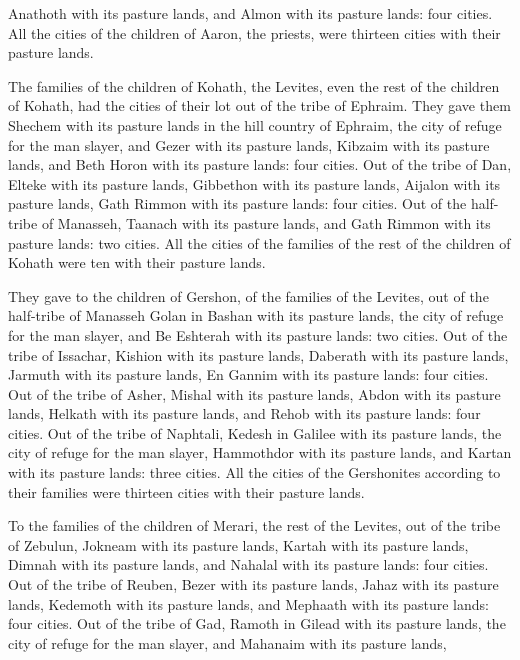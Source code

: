 {Anathoth with its pasture lands, and Almon with its pasture lands: four cities.
All the cities of the children of Aaron, the priests, were thirteen cities with their pasture lands.
\par }{\PP {}The families of the children of Kohath, the Levites, even the rest of the children of Kohath, had the cities of their lot out of the tribe of Ephraim.
They gave them Shechem with its pasture lands in the hill country of Ephraim, the city of refuge for the man slayer, and Gezer with its pasture lands,
Kibzaim with its pasture lands, and Beth Horon with its pasture lands: four cities.
Out of the tribe of Dan, Elteke with its pasture lands, Gibbethon with its pasture lands,
Aijalon with its pasture lands, Gath Rimmon with its pasture lands: four cities.
Out of the half-tribe of Manasseh, Taanach with its pasture lands, and Gath Rimmon with its pasture lands: two cities.
All the cities of the families of the rest of the children of Kohath were ten with their pasture lands.
\par }{\PP {}They gave to the children of Gershon, of the families of the Levites, out of the half-tribe of Manasseh Golan in Bashan with its pasture lands, the city of refuge for the man slayer, and Be Eshterah with its pasture lands: two cities.
Out of the tribe of Issachar, Kishion with its pasture lands, Daberath with its pasture lands,
Jarmuth with its pasture lands, En Gannim with its pasture lands: four cities.
Out of the tribe of Asher, Mishal with its pasture lands, Abdon with its pasture lands,
Helkath with its pasture lands, and Rehob with its pasture lands: four cities.
Out of the tribe of Naphtali, Kedesh in Galilee with its pasture lands, the city of refuge for the man slayer, Hammothdor with its pasture lands, and Kartan with its pasture lands: three cities.
All the cities of the Gershonites according to their families were thirteen cities with their pasture lands.
\par }{\PP {}To the families of the children of Merari, the rest of the Levites, out of the tribe of Zebulun, Jokneam with its pasture lands, Kartah with its pasture lands,
Dimnah with its pasture lands, and Nahalal with its pasture lands: four cities.
Out of the tribe of Reuben, Bezer with its pasture lands, Jahaz with its pasture lands,
Kedemoth with its pasture lands, and Mephaath with its pasture lands: four cities.
Out of the tribe of Gad, Ramoth in Gilead with its pasture lands, the city of refuge for the man slayer, and Mahanaim with its pasture lands,
}
